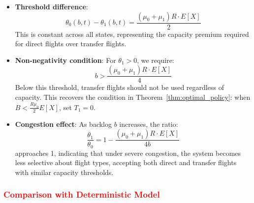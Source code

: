 \documentclass[opre,sglanonrev]{informs4}
\begin{document}
{\begin{corollary}
\begin{itemize}
    \item \textbf{Threshold difference}: 
    \[
    \theta_0(b, t) - \theta_1(b, t) = \frac{(\mu_0 + \mu_1) R \cdot E[X]}{2}
    \]
    This is constant across all states, representing the capacity premium required for direct flights over transfer flights.
    
    \item \textbf{Non-negativity condition}: For \( \theta_1 > 0 \), we require:
    \[
    b > \frac{(\mu_0 + \mu_1) R \cdot E[X]}{4}
    \]
    Below this threshold, transfer flights should not be used regardless of capacity. This recovers the condition in Theorem~\ref{thm:optimal_policy}: when \( B < \frac{R \mu_0}{2} E[X] \), set \( T_1 = 0 \).
    
    \item \textbf{Congestion effect}: As backlog \( b \) increases, the ratio:
    \[
    \frac{\theta_1}{\theta_0} = 1 - \frac{(\mu_0 + \mu_1) R \cdot E[X]}{4b}
    \]
    approaches 1, indicating that under severe congestion, the system becomes less selective about flight types, accepting both direct and transfer flights with similar capacity thresholds.
\end{itemize}
\end{corollary}
}

\subsubsection{\textcolor{red}{Comparison with Deterministic Model}}
\end{document}
